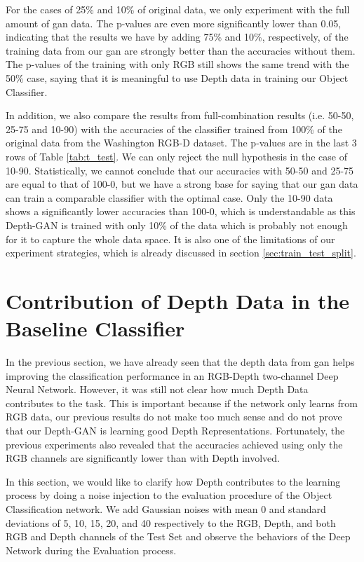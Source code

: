 For the cases of 25\% and 10\% of original data, we only experiment with the full amount of
\acrshort{gan} data. The p-values are even more significantly lower than 0.05, indicating
that the results we have by adding 75\% and 10\%, respectively, of the training data from
our \acrshort{gan} are strongly better than the accuracies without them. The p-values of
the training with only RGB still shows the same trend with the 50\% case, saying that it
is meaningful to use Depth data in training our Object Classifier.

In addition, we also compare the results from full-combination results (i.e. 50-50, 25-75
and 10-90) with the accuracies of the classifier trained from 100\% of the original data
from the Washington RGB-D dataset. The p-values are in the last 3 rows of Table
\ref{tab:t_test}. We can only reject the null hypothesis in the case of 10-90.
Statistically, we cannot conclude that our accuracies with 50-50 and 25-75 are equal to
that of 100-0, but we have a strong base for saying that our \acrshort{gan} data can train
a comparable classifier with the optimal case. Only the 10-90 data shows a significantly
lower accuracies than 100-0, which is understandable as this Depth-GAN is trained with
only 10\% of the data which is probably not enough for it to capture the whole data
space. It is also one of the limitations of our experiment strategies, which is already
discussed in section \ref{sec:train_test_split}.


\section{Contribution of Depth Data in the Baseline Classifier}
In the previous section, we have already seen that the depth data from \acrshort{gan} helps
improving the classification performance in an RGB-Depth two-channel Deep Neural Network.
However, it was still not clear how much Depth Data contributes to the task. This is
important because if the network only learns from RGB data, our previous results do not
make too much sense and do not prove that our Depth-GAN is learning good Depth
Representations. Fortunately, the previous experiments also revealed that the accuracies
achieved using only the RGB channels are significantly lower than with Depth involved. 

In this section, we would like to clarify how Depth contributes to the learning process by
doing a noise injection to the evaluation procedure of the Object Classification network.
We add Gaussian noises with mean 0 and standard deviations of 5, 10, 15, 20, and 40 respectively 
to the RGB, Depth, and both RGB and Depth channels of the Test Set and observe the
behaviors of the Deep Network during the Evaluation process. 

